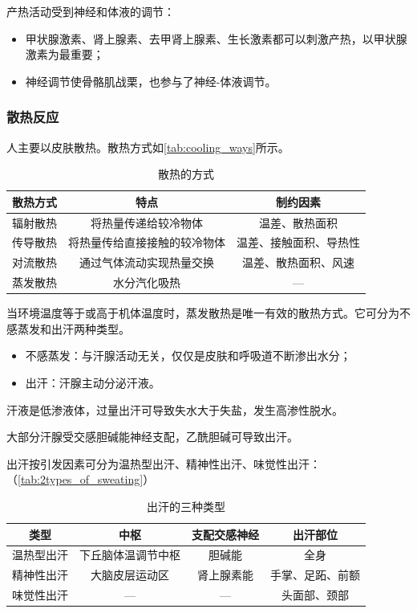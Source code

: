 产热活动受到神经和体液的调节：
\begin{itemize}
	\item 甲状腺激素、肾上腺素、去甲肾上腺素、生长激素都可以刺激产热，以甲状腺激素为最重要；
	\item 神经调节使骨骼肌战栗，也参与了神经-体液调节。
\end{itemize}

\subsubsection{散热反应}

人主要以皮肤散热。散热方式如\autoref{tab:cooling_ways}所示。

\begin{table}[htbp]
	\centering
	\begin{tabularx}{\textwidth}{|c|C|C|}
		\hline
		散热方式 & 特点 & 制约因素 \\ \hline
		辐射散热 & 将热量传递给较冷物体 & 温差、散热面积 \\ \hline
		传导散热 & 将热量传给直接接触的较冷物体 & 温差、接触面积、导热性 \\ \hline
		对流散热 & 通过气体流动实现热量交换 & 温差、散热面积、风速 \\ \hline
		蒸发散热 & 水分汽化吸热 & --- \\ \hline
	\end{tabularx}
	\caption{散热的方式}
	\label{tab:cooling_ways}
\end{table}

当环境温度等于或高于机体温度时，蒸发散热是唯一有效的散热方式。它可分为不感蒸发和出汗两种类型。
\begin{itemize}
	\item 不感蒸发：与汗腺活动无关，仅仅是皮肤和呼吸道不断渗出水分；
	\item 出汗：汗腺主动分泌汗液。
\end{itemize}

汗液是低渗液体，过量出汗可导致失水大于失盐，发生高渗性脱水。

大部分汗腺受交感胆碱能神经支配，乙酰胆碱可导致出汗。

出汗按引发因素可分为温热型出汗、精神性出汗、味觉性出汗：（\autoref{tab:2types_of_sweating}）

\begin{table}[htbp]
	\centering
	\begin{tabularx}{\textwidth}{|c|C|c|c|}
		\hline
		\textbf{类型} & \textbf{中枢} & \textbf{支配交感神经} & \textbf{出汗部位} \\ \hline
		温热型出汗 & 下丘脑体温调节中枢 & 胆碱能 & 全身 \\ \hline
		精神性出汗 & 大脑皮层运动区 & 肾上腺素能 & 手掌、足跖、前额 \\ \hline
		味觉性出汗 & --- & ---\footnotemark & 头面部、颈部 \\ \hline
	\end{tabularx}
	\caption{出汗的三种类型}
	\label{tab:2types_of_sweating}
\end{table}


